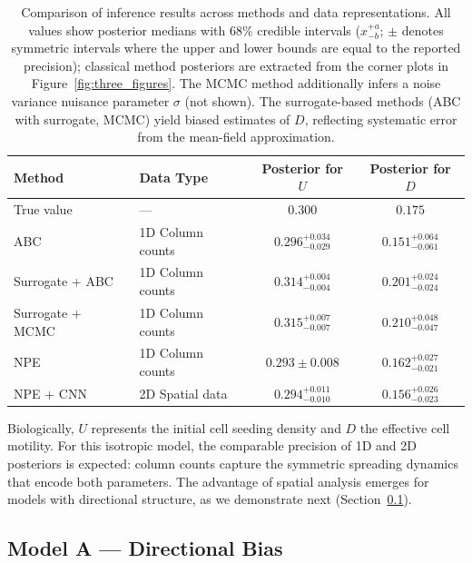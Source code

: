 \documentclass{article}
\begin{document}
\begin{table}[htbp]
	\centering
	\begin{tabular}{llcc}
		\toprule
		\textbf{Method} & \textbf{Data Type} & \textbf{Posterior for $U$} &  \textbf{Posterior for $D$}  \\
		\midrule
		True value & --- & $0.300$ & $0.175$ \\
		\midrule
		ABC & 1D Column counts & $0.296^{+0.034}_{-0.029}$ & $0.151^{+0.064}_{-0.061}$ \\
		Surrogate + ABC & 1D Column counts & $0.314^{+0.004}_{-0.004}$ & $0.201^{+0.024}_{-0.024}$ \\
		Surrogate + MCMC & 1D Column counts & $0.315^{+0.007}_{-0.007}$ & $0.210^{+0.048}_{-0.047}$ \\
		\midrule
		NPE & 1D Column counts & $0.293 \pm 0.008$ & $0.162^{+0.027}_{-0.021}$\\
		NPE + CNN & 2D Spatial data & $0.294^{+0.011}_{-0.010}$ & $0.156^{+0.026}_{-0.023}$\\
		\bottomrule
	\end{tabular}
	\caption{Comparison of inference results across methods and data representations. All values show posterior medians with 68\% credible intervals ($x^{+a}_{-b}$; $\pm$ denotes symmetric intervals where the upper and lower bounds are equal to the reported precision); classical method posteriors are extracted from the corner plots in Figure~\ref{fig:three_figures}. The MCMC method additionally infers a noise variance nuisance parameter $\sigma$ (not shown). The surrogate-based methods (ABC with surrogate, MCMC) yield biased estimates of $D$, reflecting systematic error from the mean-field approximation.}
	\label{tab:data_comparison}
\end{table}

Biologically, $U$ represents the initial cell seeding density and $D$ the effective cell motility. For this isotropic model, the comparable precision of 1D and 2D posteriors is expected: column counts capture the symmetric spreading dynamics that encode both parameters. The advantage of spatial analysis emerges for models with directional structure, as we demonstrate next (Section~\ref{sec:model_a}).



\subsection{Model A --- Directional Bias}\label{sec:model_a}
\end{document}
